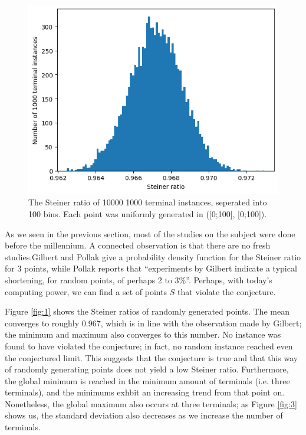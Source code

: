 \documentclass{mpaper}
\begin{document}
\begin{figure}
  \begin{center}
  \includegraphics[scale=0.5]{plot6.png}
  \end{center}
  \caption{\label{fig:6} The Steiner ratio of 10000 1000 terminal instances, seperated into 100 bins. Each point was uniformly generated in ([0;100], [0;100]).}
\end{figure}


As we seen in the previous section, most of the studies on the subject were done before the millennium. A connected observation is that there are no fresh studies.Gilbert and Pollak \cite{GP1968} give a probability density function for the Steiner ratio for 3 points, while Pollak \cite{POLLAK1978278} reports that ``experiments by Gilbert indicate a typical shortening, for random points, of perhaps 2 to 3\%''. Perhaps, with today's computing power, we can find a set of points $S$ that violate the conjecture.

Figure \ref{fig:1} shows the Steiner ratios of randomly generated points. The mean converges to roughly 0.967,  which is in line with the observation made by Gilbert; the minimum and maximum also converges to this number. No instance was found to have violated the conjecture; in fact, no random instance reached even the conjectured limit. This suggests that the conjecture is true and that this way of randomly generating points does not yield a low Steiner ratio. Furthermore, the global minimum is reached in the minimum amount of terminals (i.e. three terminals), and the minimums exhbit an increasing trend from that point on. Nonetheless, the global maximum also occurs at three terminals; as Figure \ref{fig:3} shows us, the standard deviation also decreases as we increase the number of terminals.
\end{document}
